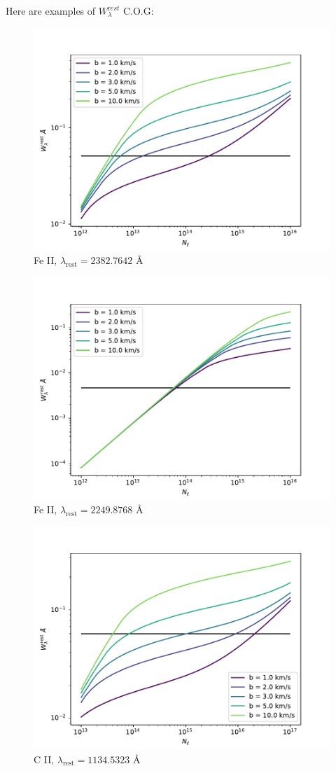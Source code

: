 \documentclass[12pt,letterpaper]{article}
\newcommand{\mt}{\mathrm}
\newcommand{\EWrest}{W^{\mt rest}_\lambda}
\newcommand{\lambdarest}{\lambda_{\textrm{rest}}}
\begin{document}
Here are examples of $\EWrest$ C.O.G:
\begin{figure}[H]
    \centering
    \includegraphics[width=0.75\columnwidth]{images/Wl_N_Fe_II_1.pdf}
    \caption{Fe II, $\lambdarest = 2382.7642$ \AA}
    \label{fig:Fe_II_2382}
\end{figure}
\begin{figure}[H]
    \centering
    \includegraphics[width=0.75\columnwidth]{images/Wl_N_Fe_II_2.pdf}
    \caption{Fe II, $\lambdarest = 2249.8768$ \AA}
    \label{fig:Fe_II_2249}
\end{figure}
\begin{figure}[H]
    \centering
    \includegraphics[width=0.75\columnwidth]{images/Wl_N_C_II.pdf}
    \caption{C II, $\lambdarest = 1134.5323$ \AA}
    \label{fig:CII}
\end{figure}
\end{document}
